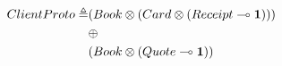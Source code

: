 \begin{align*}
ClientProto \triangleq & ({Book}\otimes{({Card}\otimes{({Receipt}\multimap{\mathbf{1}})})})\\
                       & \oplus\\
                       & ({Book}\otimes{({Quote}\multimap{\mathbf{1}})})
\end{align*}
